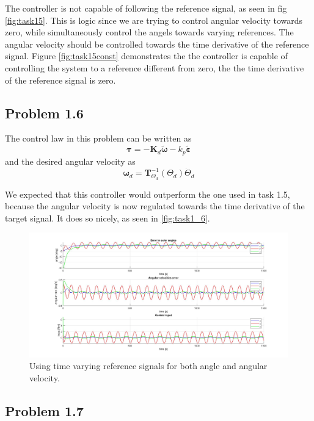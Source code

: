 The controller is not capable of following the reference signal, as seen in fig \ref{fig:task15}. This is logic since we are trying to control angular velocity towards zero, while simultaneously control the angels towards varying references. The angular velocity should be controlled towards the time derivative of the reference signal. 
Figure \ref{fig:task15const} demonstrates the the controller is capable of controlling the system to a reference different from zero, the the time derivative of the reference signal is zero. 



\subsection*{Problem 1.6}
The control law in this problem can be written as
\begin{equation}
	\boldsymbol{\tau} = -\mathbf{K}_d \tilde{\boldsymbol{\omega}} - k_p \tilde{\boldsymbol{\varepsilon}}
\end{equation}
and the desired angular velocity as
\begin{equation}
	\boldsymbol{\omega}_d = \mathbf{T}^{-1}_{\Theta_d}(\Theta_d)\dot{\Theta}_d
\end{equation}

We expected that this controller would outperform the one used in task 1.5, because the angular velocity is now regulated towards the time derivative of the target signal. It does so nicely, as seen in \autoref{fig:task1_6}. 


\begin{figure}[ht]
	\centering
	\includegraphics[width=1\textwidth]{figures/task1_6.jpg} 
	\caption{Using time varying reference signals for both angle and angular velocity.}
	\label{fig:task16}
\end{figure}

\subsection*{Problem 1.7}
